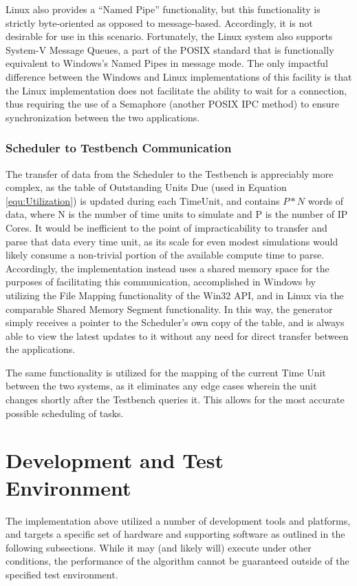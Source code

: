 Linux also provides a ``Named Pipe'' functionality, but this functionality is strictly byte-oriented as opposed to message-based. Accordingly, it is not desirable for use in this scenario. Fortunately, the Linux system also supports System-V Message Queues, a part of the POSIX standard that is functionally equivalent to Windows's Named Pipes in message mode. The only impactful difference between the Windows and Linux implementations of this facility is that the Linux implementation does not facilitate the ability to wait for a connection, thus requiring the use of a Semaphore (another POSIX IPC method) to ensure synchronization between the two applications.

\subsubsection{Scheduler to Testbench Communication}\label{subsubsec:SchedTestbenchIPC}
The transfer of data from the Scheduler to the Testbench is appreciably more complex, as the table of Outstanding Units Due (used in Equation \ref{equ:Utilization}) is updated during each TimeUnit, and contains $P*N$ words of data, where N is the number of time units to simulate and P is the number of IP Cores. It would be inefficient to the point of impracticability to transfer and parse that data every time unit, as its scale for even modest simulations would likely consume a non-trivial portion of the available compute time to parse. Accordingly, the implementation instead uses a shared memory space for the purposes of facilitating this communication, accomplished in Windows by utilizing the File Mapping functionality of the Win32 API, and in Linux via the comparable Shared Memory Segment functionality. In this way, the generator simply receives a pointer to the Scheduler's own copy of the table, and is always able to view the latest updates to it without any need for direct transfer between the applications.

The same functionality is utilized for the mapping of the current Time Unit between the two systems, as it eliminates any edge cases wherein the unit changes shortly after the Testbench queries it. This allows for the most accurate possible scheduling of tasks.

\section{Development and Test Environment}\label{sec:environment}
The implementation above utilized a number of development tools and platforms, and targets a specific set of hardware and supporting software as outlined in the following subsections. While it may (and likely will) execute under other conditions, the performance of the algorithm cannot be guaranteed outside of the specified test environment.

